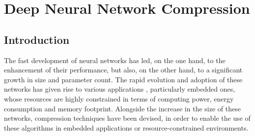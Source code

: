 \chapter{Deep Neural Network Compression}\label{chap:sota}

\localtableofcontents

\section{Introduction}\label{sec:sota:intro}

The fast development of neural networks has led, on the one hand, to the
enhancement of their performance, but also, on the other hand, to a significant
growth in size and parameter count. The rapid evolution and adoption of these
networks has given rise to various applications
\cite{DBLP:conf/nips/KrizhevskySH12,DBLP:conf/emnlp/BudzianowskiV19,silver2018general,jumper2021highly},
particularly embedded ones\cite{kim2020review,kuutti2020survey}, whose resources
are highly constrained in terms of computing power, energy consumption and
memory footprint. Alongside the increase in the size of these networks,
compression techniques
\cite{DBLP:conf/nips/CunDS89,DBLP:journals/corr/HanMD15,DBLP:conf/nips/HanPTD15}
have been devised, in order to enable the use of these algorithms in embedded
applications or resource-constrained environments.\\

